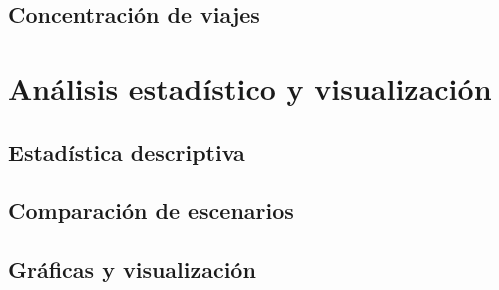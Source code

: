 \subsection{Concentración de viajes}

\section{Análisis estadístico y visualización}

\subsection{Estadística descriptiva}

\subsection{Comparación de escenarios}

\subsection{Gráficas y visualización}

\endgroup
